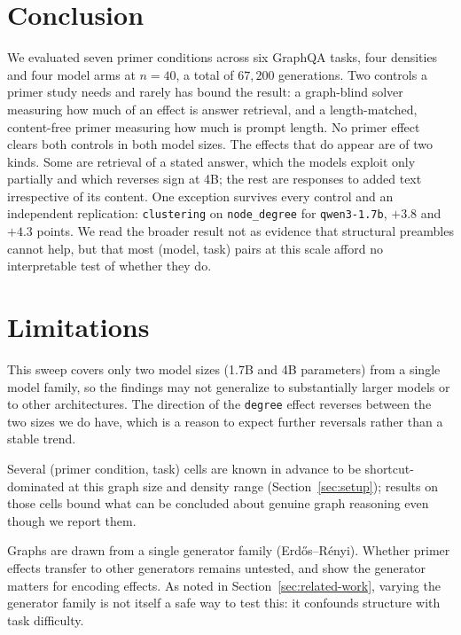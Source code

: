 \documentclass[11pt]{article}
\begin{document}
\section{Conclusion}
\label{sec:conclusion}

We evaluated seven primer conditions across six GraphQA tasks, four
densities and four model arms at $n{=}40$, a total of $67{,}200$
generations. Two controls a primer study needs and rarely has bound the
result: a graph-blind solver measuring how much of an effect is answer
retrieval, and a length-matched, content-free primer measuring how much is
prompt length. No primer effect clears both controls in both model sizes.
The effects that do appear are of two kinds. Some are retrieval of a stated
answer, which the models exploit only partially and which reverses sign at
4B; the rest are responses to added text irrespective of its content. One
exception survives every control and an independent replication:
\texttt{clustering} on \texttt{node\_degree} for \texttt{qwen3-1.7b}, $+3.8$
and $+4.3$ points. We read the broader result not as evidence that
structural preambles cannot help, but that most (model, task) pairs at this
scale afford no interpretable test of whether they do.

\section*{Limitations}
\label{sec:limitations}

This sweep covers only two model sizes (1.7B and 4B parameters) from a
single model family, so the findings may not generalize to substantially
larger models or to other architectures. The direction of the
\texttt{degree} effect reverses between the two sizes we do have, which is
a reason to expect further reversals rather than a stable trend.

Several (primer condition, task) cells are known in advance to be
shortcut-dominated at this graph size and density range
(Section~\ref{sec:setup}); results on those cells bound what can be
concluded about genuine graph reasoning even though we report them.

Graphs are drawn from a single generator family (Erd\H{o}s--R\'enyi).
Whether primer effects transfer to other generators remains untested,
and \citet{fatemi2023talklikeagraph} show the generator matters for
encoding effects. As noted in Section~\ref{sec:related-work}, varying the
generator family is not itself a safe way to test this: it confounds
structure with task difficulty.
\end{document}
